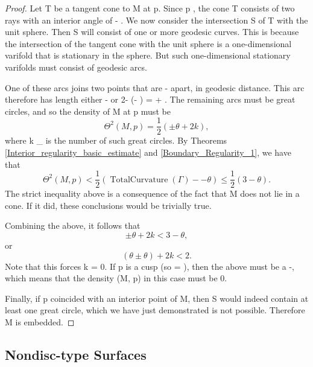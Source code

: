 \documentclass[a4paper, 11pt]{article}
\theoremstyle{plain}
\theoremstyle{definition}
\theoremstyle{remark}
\numberwithin{equation}{subsection}
\def\({}
\def\){}
\def\pi{}
\begin{document}
\begin{proof}
Let \(T\) be a tangent cone to \(M\) at \(p\). Since \(p \in \Gamma\), the cone \(T\) consists of two rays with an interior angle of \(\pi - \theta\). We now consider the intersection \(S\) of \(T\) with the unit sphere. Then \(S\) will consist of one or more geodesic curves. This is because the intersection of the tangent cone with the unit sphere is a one-dimensional varifold that is stationary in the sphere. But such one-dimensional stationary varifolds must consist of geodesic arcs.

One of these arcs joins two points that are \(\pi - \theta\) apart, in geodesic distance. This arc therefore has length either \(\pi - \theta\) or \(2\pi - (\pi - \theta) = \pi + \theta\). The remaining arcs must be great circles, and so the density of \(M\) at \(p\) must be
\begin{equation}
\Theta^{2}(M, p) = \frac{1}{2\pi}(\pi \pm \theta + 2k\pi),
\end{equation} 
where \(k \in {}_{}\) is the number of such great circles. By Theorems \ref{Interior_regularity_basic_estimate} and \ref{Boundary_Regularity_1}, we have that
\begin{equation}
\Theta^{2}(M, p) < \frac{1}{2\pi}(\operatorname{TotalCurvature}(\Gamma) - \pi - \theta) \leqslant \frac{1}{2\pi}(3\pi - \theta).
\end{equation}
The strict inequality above is a consequence of the fact that \(M\) does not lie in a cone. If it did, these conclusions would be trivially true.

Combining the above, it follows that
\begin{equation}
\pi \pm \theta + 2k\pi < 3\pi - \theta,
\end{equation}
or
\begin{equation}
(\theta \pm \theta) + 2k\pi < 2\pi.
\end{equation}
Note that this forces \(k = 0\). If \(p\) is a cusp (so \(\theta = \pi)\), then the \(\pm\) above must be a \(-\), which means that the density \(\Theta(M, p)\) in this case must be \(0\).

Finally, if \(p \in \Gamma\) coincided with an interior point of \(M\), then \(S\) would indeed contain at least one great circle, which we have just demonstrated is not possible. Therefore \(M\) is embedded.
\end{proof}



\subsection{Nondisc-type Surfaces}
\label{section: Nondisc-type Surfaces}
\end{document}
